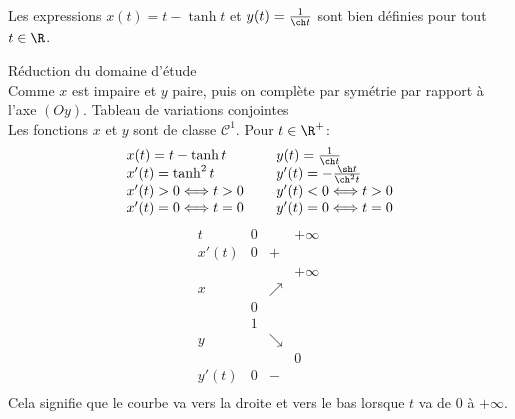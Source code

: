 {\begin{enumerate}
{\begin{center}
\end{center}
Les expressions $x(t)=t-\tanh t$ et $y(t)=\frac{1}{\ch t}$ sont bien définies pour tout $t\in\R$.
\begin{itemize}
Réduction du domaine d'étude\\
Comme $x$ est impaire et $y$ paire,  puis on complète par symétrie par rapport à l'axe $(Oy)$.
Tableau de variations conjointes\\
Les fonctions $x$ et $y$ sont de classe $\mathcal{C}^1$. Pour $t\in\R^+$:
$$\begin{array}{lcl}
x(t)=t-\tanh t&\ &y(t)=\frac{1}{\ch t}\\
x'(t)=\tanh ^2t&\ &y'(t)=-\frac{\sh t}{\ch ^2t}\\
x'(t)>0\Longleftrightarrow t>0&\ &y'(t)<0\Longleftrightarrow t>0\\
x'(t)=0\Longleftrightarrow t=0 &\ &y'(t)=0\Longleftrightarrow t=0
\end{array}$$
$$\begin{array}{c|lcr}
t&0&\ &+\infty\\\hline
x'(t)&0&+&\ \\\hline
\ &  &\ &+\infty\ \\
x&\ &\nearrow &\ \\
\ &0 &\ & \\\hline
\ &1 &\ & \\
y&\ &\searrow &\ \\
\ & &\ & 0\\\hline
y'(t)&0& - &\ \\
\end{array}$$
Cela signifie que le courbe va vers la droite et vers le bas lorsque $t$ va de $0$ à $+\infty$.

\end{itemize}}
\end{enumerate}}
